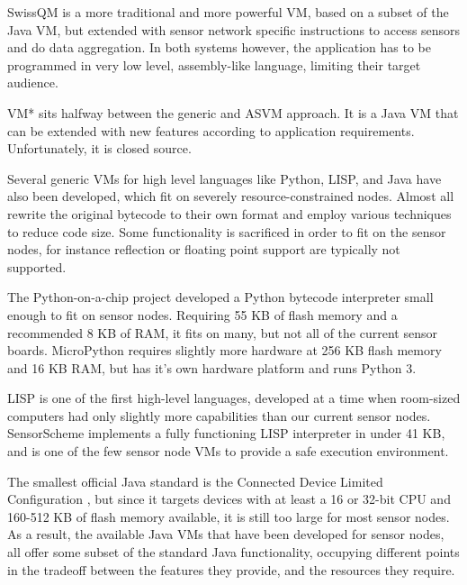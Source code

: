 SwissQM \cite{Muller:2007fs} is a more traditional and more powerful VM, based on a subset of the Java VM, but extended with sensor network specific instructions to access sensors and do data aggregation. In both systems however, the application has to be programmed in very low level, assembly-like language, limiting their target audience.

VM* \cite{Koshy:2005ww} sits halfway between the generic and ASVM approach. It is a Java VM that can be extended with new features according to application requirements. Unfortunately, it is closed source.

Several generic VMs for high level languages like Python, LISP, and Java have also been developed, which fit on severely resource-constrained nodes. Almost all rewrite the original bytecode to their own format and employ various techniques to reduce code size. Some functionality is sacrificed in order to fit on the sensor nodes, for instance reflection or floating point support are typically not supported.

The Python-on-a-chip project \cite{python-on-a-chip} developed a Python bytecode interpreter small enough to fit on sensor nodes. Requiring 55 KB of flash memory and a recommended 8 KB of RAM, it fits on many, but not all of the current sensor boards. MicroPython \cite{micropython} requires slightly more hardware at 256 KB flash memory and 16 KB RAM, but has it's own hardware platform and runs Python 3.

LISP is one of the first high-level languages, developed at a time when room-sized computers had only slightly more capabilities than our current sensor nodes. SensorScheme \cite{Evers:2010ur} implements a fully functioning LISP interpreter in under 41 KB, and is one of the few sensor node VMs to provide a safe execution environment.


The smallest official Java standard is the Connected Device Limited Configuration \cite{CLDC}, but since it targets devices with at least a 16 or 32-bit CPU and 160-512 KB of flash memory available, it is still too large for most sensor nodes. As a result, the available Java VMs that have been developed for sensor nodes, all offer some subset of the standard Java functionality, occupying different points in the tradeoff between the features they provide, and the resources they require.

